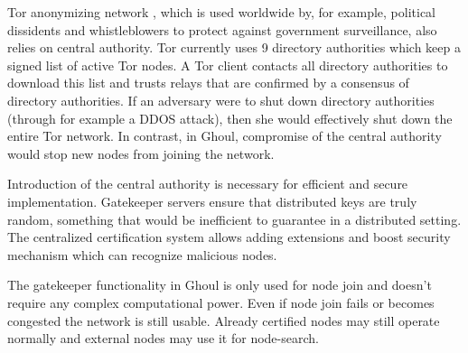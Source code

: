   Tor anonymizing network \cite{syv04}, which is used worldwide by, for example,
  political dissidents and whistleblowers to protect against government
  surveillance, also relies on central authority. Tor currently uses 9 directory
  authorities\cite{tor1,tor2} which keep a signed list of active Tor nodes.
  A Tor client contacts all directory authorities to download this list and
  trusts relays that are confirmed by a consensus of directory authorities.
  If an adversary were to shut down directory authorities (through for example a
  DDOS attack), then she would effectively shut down the entire Tor network.
  In contrast, in Ghoul, compromise of the central authority would stop new
  nodes from joining the network.

  Introduction of the central authority is necessary for efficient and secure
  implementation.
  Gatekeeper servers ensure that distributed keys are truly random, something
  that would be inefficient to guarantee in a distributed setting.
  The centralized certification system allows adding extensions and boost
  security mechanism which can recognize malicious nodes.

  The gatekeeper functionality in Ghoul is only used for node join and doesn't
  require any complex computational power. Even if node join fails or becomes
  congested the network is still usable. Already certified nodes may still
  operate normally and external nodes may use it for node-search.
